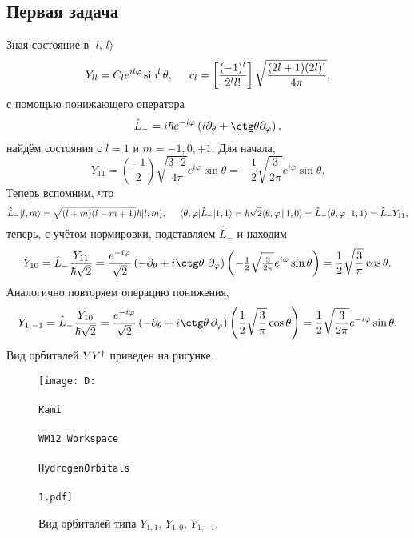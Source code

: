 \subsection*{Первая задача}


Зная состояние в $| l,\, l\rangle $
\begin{equation*}
    Y_{ll} = C_l e^{i l \varphi} \sin^l \theta, \hspace{5 mm} 
    c_l = \left[
        \frac{(-1)^l}{2^l l!}
    \right] \sqrt{\frac{(2l+1)(2l)!}{4\pi}},
\end{equation*}
с помощью понижающего оператора
\begin{equation*}
    \hat{L}_- = i \hbar e^{-i \varphi} \left(i \partial_\theta + \ctg \theta \partial_\varphi\right),
\end{equation*}
найдём состояния с $l=1$ и $m = -1, 0, +1$. Для начала,
\begin{equation*}
    Y_{11} = \left(\frac{-1}{2}\right) \sqrt{\frac{3 \cdot 2}{4 \pi}} e^{i \varphi} \sin \theta = - \frac{1}{2} \sqrt{\frac{3}{2\pi}} e^{i \varphi} \sin \theta.
\end{equation*}
Теперь вспомним, что
\begin{equation*}
    \hat{L}_- | l,m\rangle =  \sqrt{(l+m)(l-m+1)} \hbar | l,m\rangle,
    \hspace{5 mm} 
    \langle \theta, \varphi| \hat{L}_- | 1,1\rangle = \hbar \sqrt{2} \langle \theta, \varphi \,|\, 1,0 \rangle = \hat{L}_- \langle \theta,\varphi \,|\, 1,1 \rangle = \hat{L}_- Y_{11},
\end{equation*}
теперь, с учётом нормировки, подставляем $\hat{L}_-$ и находим
\begin{equation*}
    Y_{10} = \hat{L}_- \frac{Y_{11}}{\hbar \sqrt{2}} = 
    \frac{e^{-i \varphi}}{\sqrt{2}} \left(
        - \partial_\theta + i \ctg \theta \ \partial_\varphi
    \right) \left(
        - \tfrac{1}{2} \sqrt{\tfrac{3}{2\pi}} e^{i \varphi}\sin \theta
    \right) = \frac{1}{2} \sqrt{\frac{3}{\pi}} \cos \theta.
\end{equation*}
Аналогично повторяем операцию понижения,
\begin{equation*}
    Y_{1,-1} = \hat{L}_- \frac{Y_{10}}{\hbar \sqrt{2}} = 
    \frac{e^{-i\varphi}}{\sqrt{2}} \left(
        - \partial_\theta + i \ctg \theta \, \partial_\varphi
    \right) \left(
        \frac{1}{2} \sqrt{\frac{3}{\pi}} \cos \theta
    \right) = \frac{1}{2} \sqrt{\frac{3}{2\pi}} e^{- i \varphi} \sin \theta.
\end{equation*}
Вид орбиталей $Y Y^{\dag}$ приведен на рисунке. \vspace{-5mm}
\begin{figure}[h]
    \centering
    \texttt{[image: D:\\\\Kami\\\\WM12\_Workspace\\\\HydrogenOrbitals\\\\1.pdf]}
    \caption{Вид орбиталей типа $Y_{1,1}$, $Y_{1,0}$, $Y_{1,-1}$.}
\end{figure}




